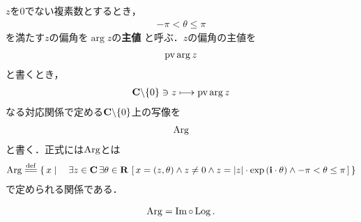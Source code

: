 	$z$を$0$でない複素数とするとき，
	\begin{align}
		-\pi < \theta \leq \pi
	\end{align}
	を満たす$z$の偏角を$\arg{z}$の{\bf 主値}
	と呼ぶ．$z$の偏角の主値を
	\begin{align}
		\operatorname{pv}{\arg{z}}
	\end{align}
	と書くとき，
	\begin{align}
		\mathbf{C} \backslash \{0\} \ni z \longmapsto \operatorname{pv}{\arg{z}}
	\end{align}
	なる対応関係で定める$\mathbf{C} \backslash \{0\}$上の写像を
	\begin{align}
		\operatorname{Arg}
	\end{align}
	と書く．正式には$\operatorname{Arg}$とは
	\begin{align}
		\pvarg \defeq \Set{x}{\exists z \in \C\, \exists \theta \in \R\, 
		\left[\, x=(z,\theta) \wedge z \neq 0 \wedge z = |z| \cdot \exp{(\isym \cdot \theta)} \wedge
		-\pi < \theta \leq \pi\, \right]}
	\end{align}
	で定められる関係である．
	
	\begin{screen}
		\begin{thm}[偏角の主値は対数の主値の虚部]
			\begin{align}
				\operatorname{Arg} = \operatorname{Im} \circ \operatorname{Log}.
			\end{align}
		\end{thm}
	\end{screen}
	
